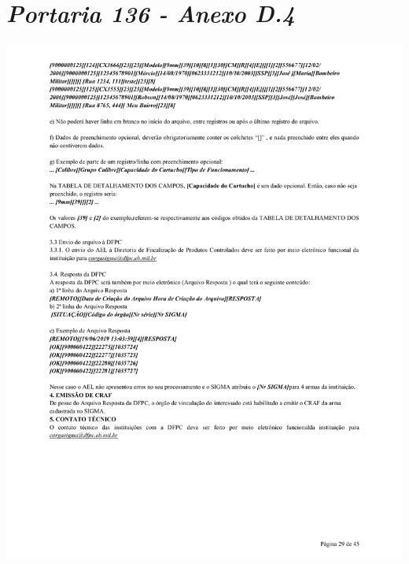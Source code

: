 \chapter{\textit{Portaria 136 - Anexo D.4}}

\label{sec:anexoA4}
\includegraphics[scale=0.8]{imagens/AnexoA4-AnexoD-portaria-136}

